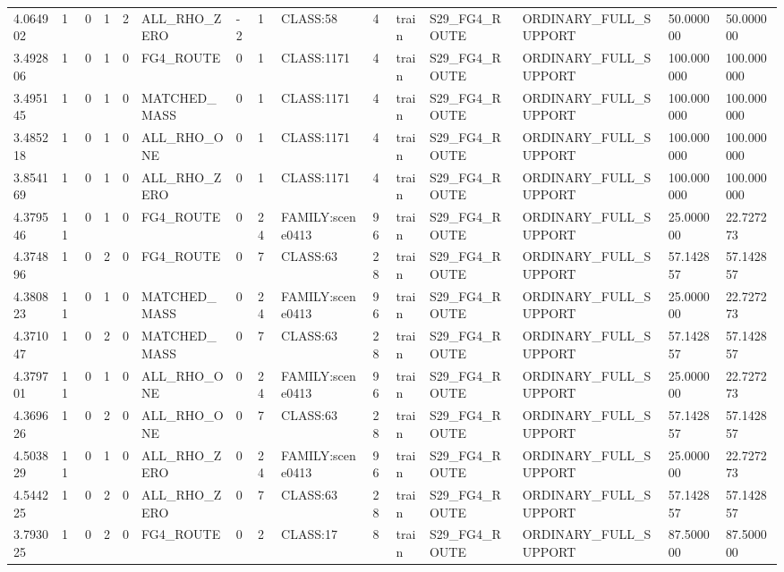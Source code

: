 \begin{tabular}{lllllllllllllll}
4.064902 & 1 & 0 & 1 & 2 & ALL\_RHO\_ZERO & -2 & 1 & CLASS:58 & 4 & train & S29\_FG4\_ROUTE & ORDINARY\_FULL\_SUPPORT & 50.000000 & 50.000000 \\
3.492806 & 1 & 0 & 1 & 0 & FG4\_ROUTE & 0 & 1 & CLASS:1171 & 4 & train & S29\_FG4\_ROUTE & ORDINARY\_FULL\_SUPPORT & 100.000000 & 100.000000 \\
3.495145 & 1 & 0 & 1 & 0 & MATCHED\_MASS & 0 & 1 & CLASS:1171 & 4 & train & S29\_FG4\_ROUTE & ORDINARY\_FULL\_SUPPORT & 100.000000 & 100.000000 \\
3.485218 & 1 & 0 & 1 & 0 & ALL\_RHO\_ONE & 0 & 1 & CLASS:1171 & 4 & train & S29\_FG4\_ROUTE & ORDINARY\_FULL\_SUPPORT & 100.000000 & 100.000000 \\
3.854169 & 1 & 0 & 1 & 0 & ALL\_RHO\_ZERO & 0 & 1 & CLASS:1171 & 4 & train & S29\_FG4\_ROUTE & ORDINARY\_FULL\_SUPPORT & 100.000000 & 100.000000 \\
4.379546 & 11 & 0 & 1 & 0 & FG4\_ROUTE & 0 & 24 & FAMILY:scene0413 & 96 & train & S29\_FG4\_ROUTE & ORDINARY\_FULL\_SUPPORT & 25.000000 & 22.727273 \\
4.374896 & 1 & 0 & 2 & 0 & FG4\_ROUTE & 0 & 7 & CLASS:63 & 28 & train & S29\_FG4\_ROUTE & ORDINARY\_FULL\_SUPPORT & 57.142857 & 57.142857 \\
4.380823 & 11 & 0 & 1 & 0 & MATCHED\_MASS & 0 & 24 & FAMILY:scene0413 & 96 & train & S29\_FG4\_ROUTE & ORDINARY\_FULL\_SUPPORT & 25.000000 & 22.727273 \\
4.371047 & 1 & 0 & 2 & 0 & MATCHED\_MASS & 0 & 7 & CLASS:63 & 28 & train & S29\_FG4\_ROUTE & ORDINARY\_FULL\_SUPPORT & 57.142857 & 57.142857 \\
4.379701 & 11 & 0 & 1 & 0 & ALL\_RHO\_ONE & 0 & 24 & FAMILY:scene0413 & 96 & train & S29\_FG4\_ROUTE & ORDINARY\_FULL\_SUPPORT & 25.000000 & 22.727273 \\
4.369626 & 1 & 0 & 2 & 0 & ALL\_RHO\_ONE & 0 & 7 & CLASS:63 & 28 & train & S29\_FG4\_ROUTE & ORDINARY\_FULL\_SUPPORT & 57.142857 & 57.142857 \\
4.503829 & 11 & 0 & 1 & 0 & ALL\_RHO\_ZERO & 0 & 24 & FAMILY:scene0413 & 96 & train & S29\_FG4\_ROUTE & ORDINARY\_FULL\_SUPPORT & 25.000000 & 22.727273 \\
4.544225 & 1 & 0 & 2 & 0 & ALL\_RHO\_ZERO & 0 & 7 & CLASS:63 & 28 & train & S29\_FG4\_ROUTE & ORDINARY\_FULL\_SUPPORT & 57.142857 & 57.142857 \\
3.793025 & 1 & 0 & 2 & 0 & FG4\_ROUTE & 0 & 2 & CLASS:17 & 8 & train & S29\_FG4\_ROUTE & ORDINARY\_FULL\_SUPPORT & 87.500000 & 87.500000 \\

\end{tabular}
